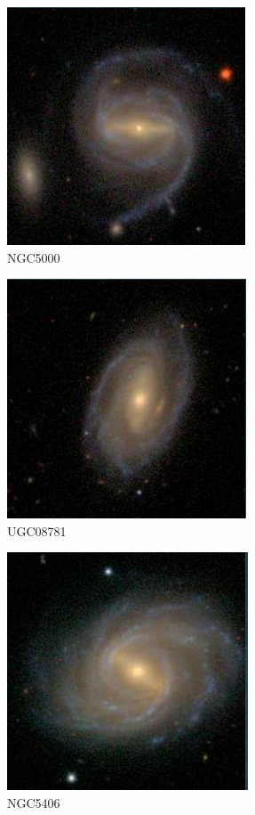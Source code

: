\documentclass[9pt]{revtex4-1}
\begin{document}
\begin{figure}
\includegraphics[scale=0.3]{NGC5000.png}
\caption{NGC5000}
\end{figure}



\begin{figure}                                           
\includegraphics[scale=0.3]{UGC08781.png}
\caption{UGC08781}
\end{figure}
\begin{figure}
\includegraphics[scale=0.3]{NGC5406.png}
\caption{NGC5406}
\end{figure}
\end{document}
